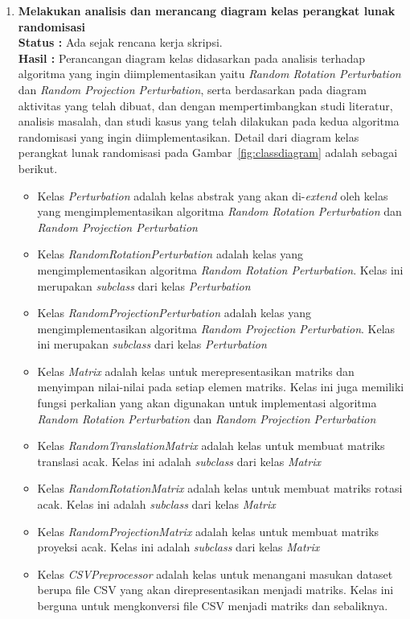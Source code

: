 \documentclass[a4paper,twoside]{article}
\begin{document}
\begin{enumerate}
		\item \textbf{Melakukan analisis dan merancang diagram kelas perangkat lunak randomisasi}\\
		{\bf Status :} Ada sejak rencana kerja skripsi.\\
		{\bf Hasil :} Perancangan diagram kelas didasarkan pada analisis terhadap algoritma yang ingin diimplementasikan yaitu \textit{Random Rotation Perturbation} dan \textit{Random Projection Perturbation}, serta berdasarkan pada diagram aktivitas yang telah dibuat, dan dengan mempertimbangkan studi literatur, analisis masalah, dan studi kasus yang telah dilakukan pada kedua algoritma randomisasi yang ingin diimplementasikan. Detail dari diagram kelas perangkat lunak randomisasi pada Gambar~\ref{fig:classdiagram} adalah sebagai berikut.
		\begin{itemize}
			\item Kelas \textit{Perturbation} adalah kelas abstrak yang akan di-\textit{extend} oleh kelas yang mengimplementasikan algoritma \textit{Random Rotation Perturbation} dan \textit{Random Projection Perturbation}
			\item Kelas \textit{RandomRotationPerturbation} adalah kelas yang mengimplementasikan algoritma \textit{Random Rotation Perturbation}. Kelas ini merupakan \textit{subclass} dari kelas \textit{Perturbation}
			\item Kelas \textit{RandomProjectionPerturbation} adalah kelas yang mengimplementasikan algoritma \textit{Random Projection Perturbation}. Kelas ini merupakan \textit{subclass} dari kelas \textit{Perturbation}
			\item Kelas \textit{Matrix} adalah kelas untuk merepresentasikan matriks dan menyimpan nilai-nilai pada setiap elemen matriks. Kelas ini juga memiliki fungsi perkalian yang akan digunakan untuk implementasi algoritma \textit{Random Rotation Perturbation} dan \textit{Random Projection Perturbation}
			\item Kelas \textit{RandomTranslationMatrix} adalah kelas untuk membuat matriks translasi acak. Kelas ini adalah \textit{subclass} dari kelas \textit{Matrix}
			\item Kelas \textit{RandomRotationMatrix} adalah kelas untuk membuat matriks rotasi acak. Kelas ini adalah \textit{subclass} dari kelas \textit{Matrix}
			\item Kelas \textit{RandomProjectionMatrix} adalah kelas untuk membuat matriks proyeksi acak. Kelas ini adalah \textit{subclass} dari kelas \textit{Matrix}
			\item Kelas \textit{CSVPreprocessor} adalah kelas untuk menangani masukan dataset berupa file CSV yang akan direpresentasikan menjadi matriks. Kelas ini berguna untuk mengkonversi file CSV menjadi matriks dan sebaliknya.
		\end{itemize}
		

\end{enumerate}
\end{document}
